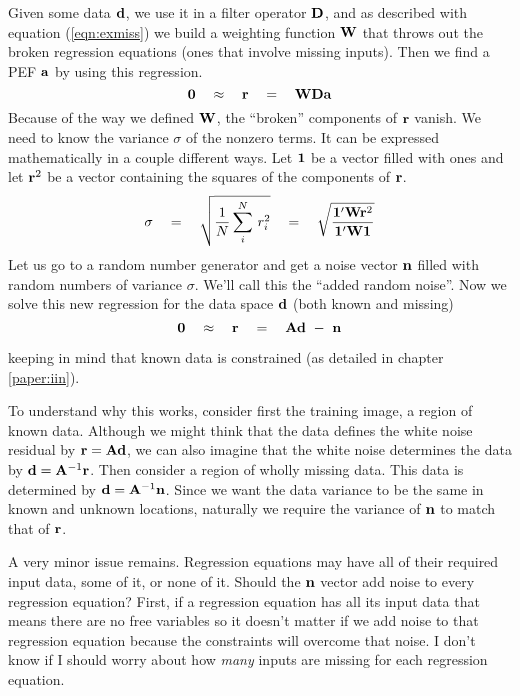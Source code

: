 \par
Given some data $\bold d$, we use it in a filter operator $\bold D$,
and as described with equation (\ref{eqn:exmiss}) we build
a weighting function $\bold W$ that throws out the
broken regression equations (ones that involve missing inputs).
Then we find a PEF $\bold a$ by using this regression.
\begin{equation}
	\bold 0
\quad\approx\quad
	\bold r
\quad = \quad
	\bold W \bold D \bold a
\end{equation}
Because of the way we defined $\bold W$,
the ``broken'' components of $\bold r$ vanish.
We need to know the variance $\sigma$ of the nonzero terms.
It can be expressed mathematically in a couple different ways.
Let $\bold 1$ be a vector filled with ones and let
$\bold r^2$ be a vector containing the squares of the components of $\bold r$.
\begin{equation}
\sigma
\quad = \quad
	\sqrt{ {1\over N} \sum_i^N \,r_i^2 }
\quad = \quad
	\sqrt{
		\bold 1' \bold W \bold r^2
	\over
		\bold 1' \bold W \bold 1 
	}
\end{equation}
Let us go to a random number generator
and get a noise vector $\bold n$
filled with random numbers of variance $\sigma$.
We'll call this the ``added random noise''.
Now we solve this new regression for
the data space $\bold d$ (both known and missing)
\begin{equation}
\bold 0
\quad\approx\quad
\bold r
\quad = \quad
\bold A \bold d   \ - \  \bold n
\label{eqn:noiseeverywhere}
\end{equation}
\par\noindent
keeping in mind that known data is constrained
(as detailed in chapter \ref{paper:iin}).

\par
To understand why this works,
consider first the training image, a region of known data.
Although we might think that the data defines the white noise
residual by $\bold r=\bold A\bold d$, we can also imagine that the white noise
determines the data by $\bold d=\bold A^{-1}\bold r$.
Then consider a region of wholly missing data.  This data
is determined by $\bold d=\bold A^{-1}\bold n$.
Since we want the data variance to be the same in known and unknown
locations, naturally we require the variance of $\bold n$
to match that of $\bold r$.

\par
A very minor issue remains.
Regression equations may have all of their required input data,
some of it, or none of it.
Should the $\bold n$ vector add noise to every regression equation?
First, if a regression equation has all its input data
that means there are no free variables so it doesn't matter
if we add noise to that regression equation because the constraints
will overcome that noise.
I don't know if I should worry about how
{\it many}
inputs are missing for each regression equation.

